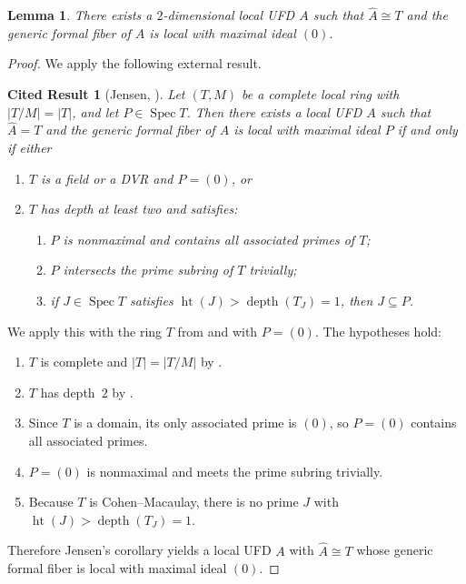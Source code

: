 \documentclass[]{pkuai4m}
\theoremstyle{plain}
\newtheorem{lemma}[theorem]{Lemma}
\newtheorem{cited}[theorem]{Cited Result}
\theoremstyle{definition}
\begin{document}
\begin{lemma}\label{lem:jensen_special_case-appendix}
There exists a $2$-dimensional local UFD $A$ such that $\widehat{A}\cong T$ and the generic formal fiber of $A$ is local with maximal ideal $(0)$.
\end{lemma}

\begin{proof}
We apply the following external result.

\begin{cited}[{Jensen, \cite[Corollary 2.4]{jensen2006completions}}]
Let $(T,M)$ be a complete local ring with $|T/M| = |T|$, and let $P \in \operatorname{Spec} T$. Then there exists a local UFD $A$ such that $\widehat A = T$ and the generic formal fiber of $A$ is local with maximal ideal $P$ if and only if either
\begin{enumerate}
\item $T$ is a field or a DVR and $P = (0)$, or
\item $T$ has depth at least two and satisfies:
    \begin{enumerate}
        \item $P$ is nonmaximal and contains all associated primes of $T$;
        \item $P$ intersects the prime subring of $T$ trivially;
        \item if $J \in \operatorname{Spec} T$ satisfies $\operatorname{ht}(J) > \operatorname{depth}(T_J) = 1$, then $J \subseteq P$.
    \end{enumerate}
\end{enumerate}
\end{cited}

We apply this with the ring $T$ from  and with $P=(0)$. The hypotheses hold:

\begin{enumerate}
\item $T$ is complete and $|T|=|T/M|$ by .
\item $T$ has depth~$2$ by .
\item Since $T$ is a domain, its only associated prime is $(0)$, so $P=(0)$ contains all associated primes.
\item $P=(0)$ is nonmaximal and meets the prime subring trivially.
\item Because $T$ is Cohen--Macaulay, there is no prime $J$ with $\operatorname{ht}(J)>\operatorname{depth}(T_J)=1$.
\end{enumerate}

Therefore Jensen’s corollary yields a local UFD $A$ with $\widehat A\cong T$ whose generic formal fiber is local with maximal ideal $(0)$.
\end{proof}
\end{document}
